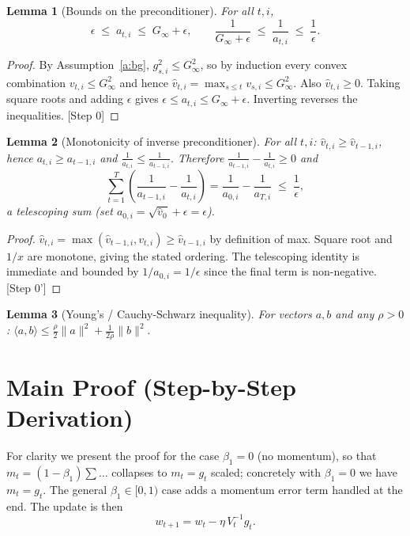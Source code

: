 \documentclass[11pt]{article}
\newtheorem{lemma}{Lemma}
\begin{document}
\begin{lemma}[Bounds on the preconditioner]\label{lem:precond}
For all $t,i$,
\[
\epsilon \;\le\; a_{t,i} \;\le\; G_\infty + \epsilon,
\qquad
\frac{1}{G_\infty+\epsilon}\;\le\;\frac{1}{a_{t,i}}\;\le\;\frac{1}{\epsilon}.
\]
\end{lemma}
\begin{proof}
By Assumption~\ref{a:bg}, $g_{s,i}^2\le G_\infty^2$, so by induction every
convex combination $v_{t,i}\le G_\infty^2$ and hence
$\hat v_{t,i}=\max_{s\le t}v_{s,i}\le G_\infty^2$. Also $\hat v_{t,i}\ge 0$.
Taking square roots and adding $\epsilon$ gives
$\epsilon\le a_{t,i}\le G_\infty+\epsilon$. Inverting reverses the
inequalities. \hfill[Step 0]
\end{proof}

\begin{lemma}[Monotonicity of inverse preconditioner]\label{lem:mono}
For all $t,i$: $\hat v_{t,i}\ge \hat v_{t-1,i}$, hence $a_{t,i}\ge a_{t-1,i}$
and $\frac{1}{a_{t,i}}\le \frac{1}{a_{t-1,i}}$. Therefore
$\frac{1}{a_{t-1,i}}-\frac{1}{a_{t,i}}\ge 0$ and
\[
\sum_{t=1}^{T}\left(\frac{1}{a_{t-1,i}}-\frac{1}{a_{t,i}}\right)
=\frac{1}{a_{0,i}}-\frac{1}{a_{T,i}}\;\le\;\frac{1}{\epsilon},
\]
a telescoping sum (set $a_{0,i}=\sqrt{\hat v_0}+\epsilon=\epsilon$).
\end{lemma}
\begin{proof}
$\hat v_{t,i}=\max(\hat v_{t-1,i},v_{t,i})\ge \hat v_{t-1,i}$ by definition of
max. Square root and $1/x$ are monotone, giving the stated ordering. The
telescoping identity is immediate and bounded by $1/a_{0,i}=1/\epsilon$ since
the final term is non-negative. \hfill[Step 0']
\end{proof}

\begin{lemma}[Young's / Cauchy-Schwarz inequality]\label{lem:young}
For vectors $a,b$ and any $\rho>0$:
$\langle a,b\rangle \le \tfrac{\rho}{2}\|a\|^2 + \tfrac{1}{2\rho}\|b\|^2.$
\end{lemma}

\section*{Main Proof (Step-by-Step Derivation)}

For clarity we present the proof for the case $\beta_1=0$ (no momentum), so that
$m_t = (1-\beta_1)\sum\dots$ collapses to $m_t = g_t$ scaled; concretely with
$\beta_1=0$ we have $m_t = g_t$. The general $\beta_1\in[0,1)$ case adds a
momentum error term handled at the end. The update is then
\[
w_{t+1} = w_t - \eta\,V_t^{-1} g_t. \tag{U}
\]
\end{document}
